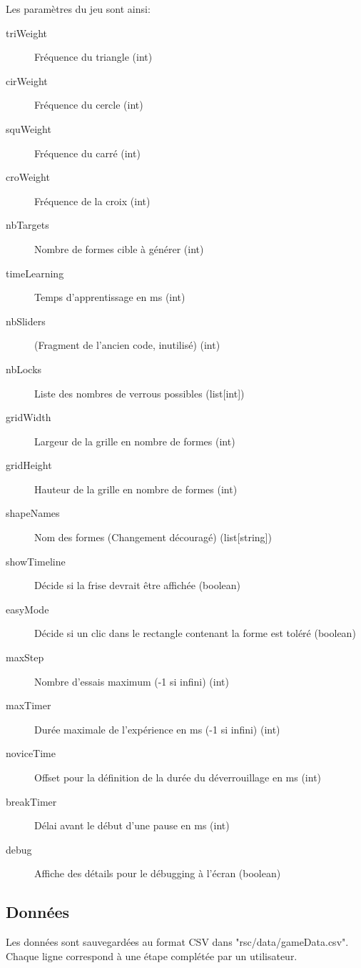 \documentclass[a4paper, 12pt]{report}
\begin{document}
        Les paramètres du jeu sont ainsi:
        \begin{description}
            \item[triWeight] Fréquence du triangle (int)
            \item[cirWeight] Fréquence du cercle (int)
            \item[squWeight] Fréquence du carré (int)
            \item[croWeight] Fréquence de la croix (int)
            \item[nbTargets] Nombre de formes cible à générer (int)
            \item[timeLearning] Temps d'apprentissage en ms (int)
            \item[nbSliders] (Fragment de l'ancien code, inutilisé) (int)
            \item[nbLocks] Liste des nombres de verrous possibles (list[int])
            \item[gridWidth] Largeur de la grille en nombre de formes (int)
            \item[gridHeight] Hauteur de la grille en nombre de formes (int)
            \item[shapeNames] Nom des formes (Changement découragé) (list[string])
            \item[showTimeline] Décide si la frise devrait être affichée (boolean)
            \item[easyMode] Décide si un clic dans le rectangle contenant la forme est toléré (boolean)
            \item[maxStep] Nombre d'essais maximum (-1 si infini) (int)
            \item[maxTimer] Durée maximale de l'expérience en ms (-1 si infini) (int)
            \item[noviceTime] Offset pour la définition de la durée du déverrouillage en ms (int)
            \item[breakTimer] Délai avant le début d'une pause en ms (int)
            \item[debug] Affiche des détails pour le débugging à l'écran (boolean)
        \end{description}
        
        \subsection{Données}
        Les données sont sauvegardées au format CSV dans "rsc/data/gameData.csv". 
        Chaque ligne correspond à une étape complétée par un utilisateur.
        
\end{document}
